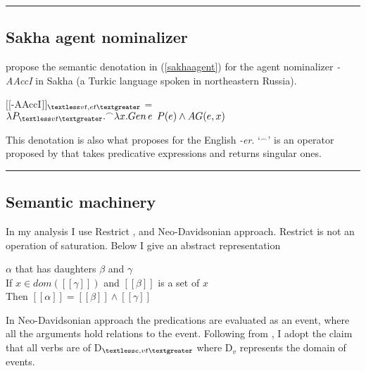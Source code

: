     \rule{\columnwidth}{0.2pt}
    
    \subsection{Sakha agent nominalizer}
    \cite{baker2009agent} propose the semantic denotation in (\ref{sakhaagent}) for the agent nominalizer \textit{-AAccI} in Sakha (a Turkic language spoken in northeastern Russia).
    
    \begin{exe}
    \ex \label{sakhaagent} $[[$-AAccI$]]_{\textless vt, et \textgreater}$ = $\lambda{P_{\textless vt \textgreater}}.^{\frown}\lambda{x}. Gen\,e \; \,P(e) \wedge AG(e,x)$ 
    \end{exe}
    
    This denotation is also what \cite{baker2009agent} proposes for the English \textit{-er}. `$^{\frown}$' is an operator proposed by \cite{chierchia1985formal} that takes predicative expressions and returns singular ones. 
    \rule{\columnwidth}{0.2pt}
    
    \subsection{Semantic machinery}
    
    In my analysis I use Restrict \citep{chung2003restriction}, and Neo-Davidsonian \citep{kratzer1996severing,maienborn2011event, parsons1990events} approach. Restrict is not an operation of saturation. Below I give an abstract representation
    
    \begin{framed}
    $\alpha$ that has daughters $\beta$ and $\gamma$ \\
    If $x \in{dom([[\gamma]])}$ and $[[\beta]]$ is a set of $x$ \\
    Then $[[\alpha]] = [[\beta]] \wedge [[\gamma]]$
    \end{framed}
    
    In Neo-Davidsonian approach the predications are evaluated as an event, where all the arguments hold relations to the event. Following from \cite{kratzer1996severing}, I adopt the claim that all verbs are of D$_{\textless e,vt\textgreater}$ where D$_v$ represents the domain of events.